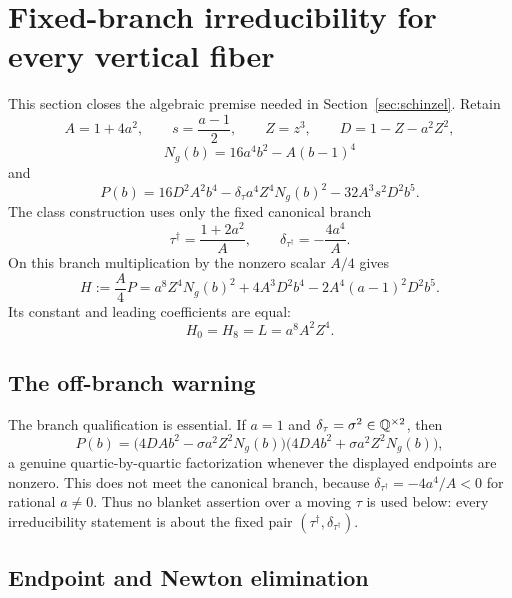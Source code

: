 \section{Fixed-branch irreducibility for every vertical fiber}
\label{sec:irreducibility}

This section closes the algebraic premise needed in
Section~\ref{sec:schinzel}.  Retain
\[
 A=1+4a^2,\qquad s=\frac{a-1}{2},\qquad
 Z=z^3,\qquad D=1-Z-a^2Z^2,
\]
\[
 N_g(b)=16a^4b^2-A(b-1)^4
\]
and
\begin{equation}
 P(b)=16D^2A^2b^4-\delta_\tau a^4Z^4N_g(b)^2
       -32A^3s^2D^2b^5. \label{eq:value-P}
\end{equation}
The class construction uses only the fixed canonical branch
\[
 \tau^\dagger=\frac{1+2a^2}{A},
 \qquad
 \delta_{\tau^\dagger}=-\frac{4a^4}{A}.
\]
On this branch multiplication by the nonzero scalar $A/4$ gives
\begin{equation}
 H:=\frac A4P
 =a^8Z^4N_g(b)^2+4A^3D^2b^4
  -2A^4(a-1)^2D^2b^5.                 \label{eq:integral-model}
\end{equation}
Its constant and leading coefficients are equal:
\begin{equation}
 H_0=H_8=L=a^8A^2Z^4.                 \label{eq:equal-endpoints}
\end{equation}

\subsection{The off-branch warning}

The branch qualification is essential.  If $a=1$ and
$\delta_\tau=\sigma^2\in\mathbb{Q}^{\times2}$, then
\[
 P(b)=
 \bigl(4DAb^2-\sigma a^2Z^2N_g(b)\bigr)
 \bigl(4DAb^2+\sigma a^2Z^2N_g(b)\bigr),
\]
a genuine quartic-by-quartic factorization whenever the displayed
endpoints are nonzero.  This does not meet the canonical branch, because
$\delta_{\tau^\dagger}=-4a^4/A<0$ for rational $a\ne0$.
Thus no blanket assertion over a moving $\tau$ is used below: every
irreducibility statement is about the fixed pair
$(\tau^\dagger,\delta_{\tau^\dagger})$.

\subsection{Endpoint and Newton elimination}

